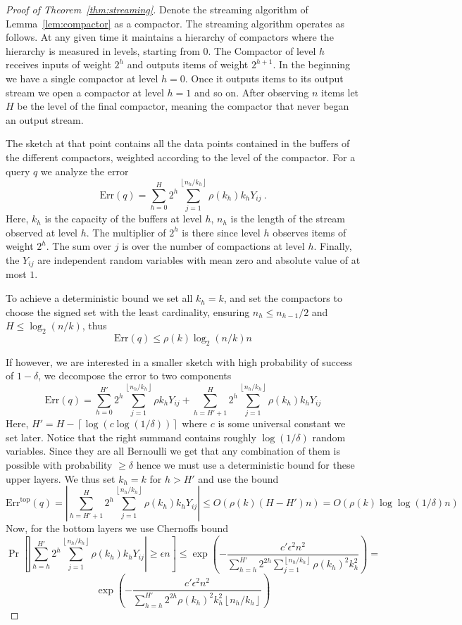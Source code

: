 \documentclass[anon,12pt]{colt2019} %
\newcommand{\eps}{\epsilon}
\newcommand{\floor}[1]{\left \lfloor #1 \right \rfloor}
\newcommand{\ceil}[1]{\left \lceil #1 \right \rceil}
\renewcommand{\Pr}{\operatorname{Pr}}
\begin{document}
\begin{proof} [Proof of Theorem~\ref{thm:streaming}]
Denote the streaming algorithm of Lemma~\ref{lem:compactor} as a compactor. The streaming algorithm operates as follows. At any given time it maintains a hierarchy of compactors where the hierarchy is measured in levels, starting from 0. The Compactor of level $h$ receives inputs of weight $2^h$ and outputs items of weight $2^{h+1}$. In the beginning we have a single compactor at level $h=0$. Once it outputs items to its output stream we open a compactor at level $h=1$ and so on. After observing $n$ items let $H$ be the level of the final compactor, meaning the compactor that never began an output stream.

The sketch at that point contains all the data points contained in the buffers of the different compactors, weighted according to the level of the compactor. For a query $q$ we analyze the error
$$\text{Err}(q) = \sum_{h=0}^H 2^h \sum_{j=1}^{\floor{n_h/k_h} } \rho(k_h) k_h Y_{ij} \ .$$
Here, $k_h$ is the capacity of the buffers at level $h$, $n_h$ is the length of the stream observed at level $h$. The multiplier of $2^h$ is there since level $h$ observes items of weight $2^h$. The sum over $j$ is over the number of compactions at level $h$. Finally, the $Y_{ij}$ are independent random variables with mean zero and absolute value of at most $1$. 

To achieve a deterministic bound we set all $k_h=k$, and set the compactors to choose the signed set with the least cardinality, ensuring $n_h \leq n_{h-1}/2$ and $H \leq \log_2(n/k)$, thus
$$ \text{Err}(q) \leq \rho(k) \log_2(n/k) n $$

If however, we are interested in a smaller sketch with high probability of success of $1-\delta$, we decompose the error to two components
$$\text{Err}(q) = \sum_{h=0}^{H'} 2^h \sum_{j=1}^{\floor{n_h/k_h} } \rho k_h Y_{ij} + \sum_{h=H'+1}^H 2^h \sum_{j=1}^{\floor{n_h/k_h} } \rho(k_h) k_h Y_{ij}$$
 Here, $H' = H - \ceil{\log(c \log(1/ \delta))}$ where $c$ is some universal constant we set later. Notice that the right summand contains roughly $\log(1/\delta)$ random variables. Since they are all Bernoulli we get that any combination of them is possible with probability $\geq \delta$ hence we must use a deterministic bound for these upper layers. We thus set $k_h=k$ for $h > H'$ and use the bound
$$ \text{Err}^{\text{top}}(q) = \left|\sum_{h=H'+1}^H 2^h \sum_{j=1}^{\floor{n_h/k_h} } \rho(k_h) k_h Y_{ij}\right| \leq O\left( \rho(k) \left(H-H'\right) n \right) =  O\left( \rho(k) \log \log(1/ \delta) n \right) $$
Now, for the bottom layers we use Chernoffs bound
$$ \Pr\left[   \left|\sum_{h=h}^{H'} 2^h \sum_{j=1}^{\floor{n_h/k_h} } \rho(k_h) k_h Y_{ij} \right| \geq \eps n \right] \leq \exp \left( -\frac{c' \eps^2 n^2}{\sum_{h=h}^{H'} 2^{2h} \sum_{j=1}^{\floor{n_h/k_h} } \rho(k_h)^2 k_h^2}   \right) =$$
$$\exp \left( -\frac{c' \eps^2 n^2}{\sum_{h=h}^{H'} 2^{2h} \rho(k_h)^2 k_h^2 \floor{n_h/k_h} } \right) $$


\end{proof}
\end{document}
